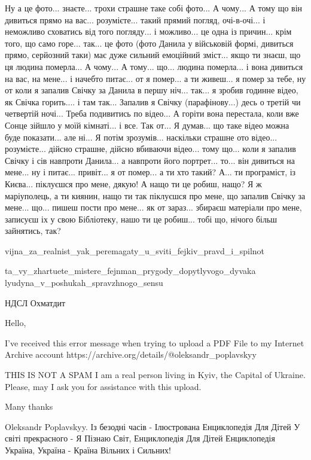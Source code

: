 Ну а це фото... знаєте... трохи страшне таке собі фото... А чому... А
тому що він дивиться прямо на вас... розумієте... такий прямий погляд,
очі-в-очі... і неможливо сховатись від того погляду... і можливо... це одна із
причин... крім того, що само горе... так... це фото (фото Данила у військовій
формі, дивиться прямо, серйозний таки) має дуже сильний емоційний зміст... якщо
ти знаєш, що ця людина померла... А чому... А тому... що... людина померла... і
вона дивиться на вас, на мене... і начебто питає... от я помер... а ти живеш...
я помер за тебе, ну от коли я запалив Свічку за Данила в першу ніч... так... я
зробив годинне відео, як Свічка горить.... і там так... Запалив я Свічку
(парафінову...) десь о третій чи четвертій ночі... Треба подивитись по відео...
А горіти вона перестала, коли вже Сонце зійшло у моїй кімнаті... і все. Так
от... Я думав... що таке відео можна буде показати... але ні... Я потім
зрозумів... наскільки страшне ото відео... розумієте... дійсно страшне, дійсно
вбиваючи відео... тому що...  коли я запалив Свічку і сів навпроти Данила... а
навпроти його портрет... то... він дивиться на мене... ну і питає... привіт...
я от помер... а ти хто такий? А... ти програміст, із Києва... піклуєшся про
мене, дякую! А нащо ти це робиш, нащо? Я ж маріуполець, а ти киянин, нащо ти
так піклуєшся про мене, що запалив Свічку за мене... що... пишеш пости про
мене... як от зараз... збираєш матеріали про мене, записуєш іх у свою
Бібліотеку, нашо ти це робиш... тобі що, нічого більш зайнятись, так?

vijna_za_realnist_yak_peremagaty_u_sviti_fejkiv_pravd_i_spilnot

ta_vy_zhartuete_mistere_fejnman_prygody_dopytlyvogo_dyvaka
lyudyna_v_poshukah_spravzhnogo_sensu



НДСЛ Охматдит


Hello,

I've received this error message when trying to upload a PDF File to my Internet Archive account
https://archive.org/details/@oleksandr_poplavskyy

THIS IS NOT A SPAM I am a real person living in Kyiv, the Capital of Ukraine. 
Please, may I ask you for assistance with this upload.

Many thanks

Oleksandr Poplavskyy.
Із безодні часів - Ілюстрована Енциклопедія Для Дітей
У світі прекрасного - Я Пізнаю Світ, Енциклопедія Для Дітей
Енциклопедія Україна, Україна - Країна Вільних і Сильних!

